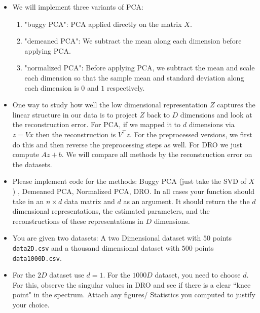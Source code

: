 \documentclass[a4paper]{article}
\theoremstyle{definition}
\begin{document}
\begin{itemize}
\item We will implement three variants of PCA:
\begin{enumerate}
    \item "buggy PCA": PCA applied directly on the matrix $X$.
    \item "demeaned PCA": We subtract the mean along each dimension before applying PCA.
    \item "normalized PCA": Before applying PCA, we subtract the mean and scale each dimension so that the sample  mean and standard deviation along each dimension is $0$ and $1$ respectively.
    
\end{enumerate}



\item 
One way to study how well the low dimensional representation $Z$ captures the linear
structure in our data is to project $Z$ back to $D$ dimensions and look at the reconstruction
error. For PCA, if we mapped it to $d$ dimensions via $z = Vx$ then the
reconstruction is $V^\top z$. For the preprocessed versions, we first do this and then
reverse the preprocessing steps as well. For DRO  we just compute $Az + b$.
We will compare all methods by the reconstruction error on the datasets.

\item 
Please implement code for the methods: Buggy PCA (just take the SVD of $X$)
, Demeaned PCA,
Normalized PCA, DRO. In all cases your function should take in
an $n \times d$ data matrix and $d$ as an argument. It should return the
the $d$ dimensional representations, the estimated parameters, and the
reconstructions of these representations in $D$ dimensions. 

\item
You are given two datasets: A two Dimensional dataset with $50$ points 
\texttt{data2D.csv} and a thousand dimensional dataset with $500$ points
\texttt{data1000D.csv}. 

\item
For the $2D$ dataset use $d=1$. For the $1000D$ dataset, you need to choose
$d$. For this, observe the singular values in DRO and see if there is a clear
``knee point" in the spectrum.
Attach any figures/ Statistics you computed to justify your choice.


\end{itemize}
\end{document}
